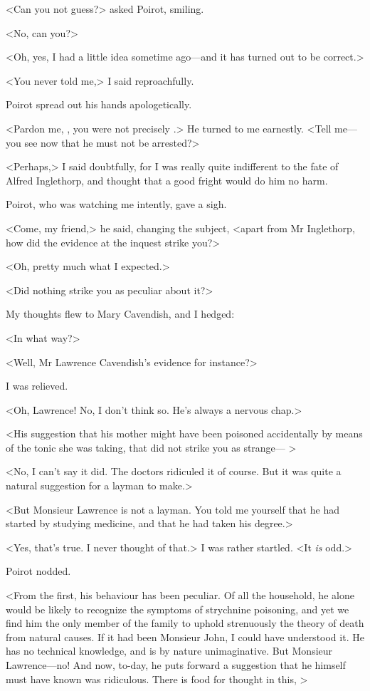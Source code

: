  <Can you not guess?> asked Poirot, smiling. 

 <No, can you?> 

 <Oh, yes, I had a little idea sometime ago—and it has turned out to be correct.> 

 <You never told me,> I said reproachfully. 

 Poirot spread out his hands apologetically. 

 <Pardon me, , you were not precisely .> He turned to me earnestly. <Tell me—you see now that he must not be arrested?> 

 <Perhaps,> I said doubtfully, for I was really quite indifferent to the fate of Alfred Inglethorp, and thought that a good fright would do him no harm. 

 Poirot, who was watching me intently, gave a sigh. 

 <Come, my friend,> he said, changing the subject, <apart from Mr Inglethorp, how did the evidence at the inquest strike you?> 

 <Oh, pretty much what I expected.> 

 <Did nothing strike you as peculiar about it?> 

 My thoughts flew to Mary Cavendish, and I hedged: 

 <In what way?> 

 <Well, Mr Lawrence Cavendish's evidence for instance?> 

 I was relieved. 

 <Oh, Lawrence! No, I don't think so. He's always a nervous chap.> 

 <His suggestion that his mother might have been poisoned accidentally by means of the tonic she was taking, that did not strike you as strange— > 

 <No, I can't say it did. The doctors ridiculed it of course. But it was quite a natural suggestion for a layman to make.> 

 <But Monsieur Lawrence is not a layman. You told me yourself that he had started by studying medicine, and that he had taken his degree.> 

 <Yes, that's true. I never thought of that.> I was rather startled. <It \emph{is} odd.> 

 Poirot nodded. 

 <From the first, his behaviour has been peculiar. Of all the household, he alone would be likely to recognize the symptoms of strychnine poisoning, and yet we find him the only member of the family to uphold strenuously the theory of death from natural causes. If it had been Monsieur John, I could have understood it. He has no technical knowledge, and is by nature unimaginative. But Monsieur Lawrence—no! And now, to-day, he puts forward a suggestion that he himself must have known was ridiculous. There is food for thought in this, > 

